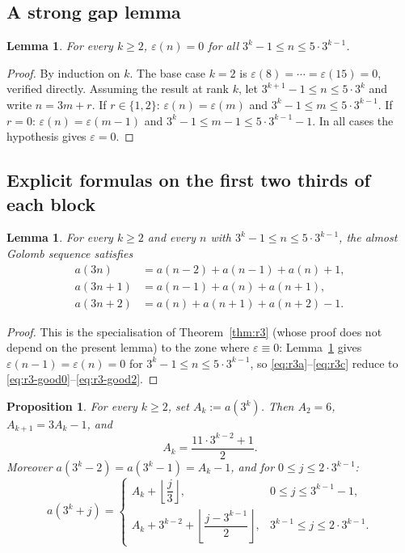 \documentclass[12pt]{article}
\newtheorem{lemma}[theorem]{Lemma}
\newtheorem{proposition}[theorem]{Proposition}
\theoremstyle{definition}
\theoremstyle{remark}
\begin{document}
\subsection{A strong gap lemma}

\begin{lemma}\label{lem:r3-gap}
For every $k\ge 2$, $\varepsilon(n)=0$ for all $3^k-1\le n\le 5\cdot 3^{k-1}$.
\end{lemma}

\begin{proof}
By induction on $k$. The base case $k=2$ is $\varepsilon(8)=\cdots=\varepsilon(15)=0$,
verified directly. Assuming the result at rank $k$, let $3^{k+1}-1\le n\le 5\cdot 3^k$
and write $n=3m+r$.
If $r\in\{1,2\}$: $\varepsilon(n)=\varepsilon(m)$ and $3^k-1\le m\le 5\cdot 3^{k-1}$.
If $r=0$: $\varepsilon(n)=\varepsilon(m-1)$ and $3^k-1\le m-1\le 5\cdot 3^{k-1}-1$.
In all cases the hypothesis gives $\varepsilon=0$.
\end{proof}

\subsection{Explicit formulas on the first two thirds of each block}

\begin{lemma}\label{lem:r3-good-zone}
For every $k\ge 2$ and every $n$ with $3^k-1\le n\le 5\cdot 3^{k-1}$,
the almost Golomb sequence satisfies
\begin{align}
  a(3n)   &= a(n-2)+a(n-1)+a(n)+1, \label{eq:r3-good0}\\
  a(3n+1) &= a(n-1)+a(n)+a(n+1),   \label{eq:r3-good1}\\
  a(3n+2) &= a(n)+a(n+1)+a(n+2)-1. \label{eq:r3-good2}
\end{align}
\end{lemma}

\begin{proof}
This is the specialisation of Theorem~\ref{thm:r3}
(whose proof does not depend on the present lemma) to the zone
where $\varepsilon\equiv 0$: Lemma~\ref{lem:r3-gap} gives
$\varepsilon(n-1)=\varepsilon(n)=0$ for $3^k-1\le n\le 5\cdot 3^{k-1}$,
so \eqref{eq:r3a}--\eqref{eq:r3c} reduce to
\eqref{eq:r3-good0}--\eqref{eq:r3-good2}.
\end{proof}

\begin{proposition}\label{prop:r3-block}
For every $k\ge 2$, set $A_k:=a(3^k)$. Then $A_2=6$, $A_{k+1}=3A_k-1$, and
\[
  A_k=\frac{11\cdot 3^{k-2}+1}{2}.
\]
Moreover $a(3^k-2)=a(3^k-1)=A_k-1$, and for $0\le j\le 2\cdot 3^{k-1}$:
\begin{equation}\label{eq:r3-block}
a(3^k+j)=
\begin{cases}
  A_k+\left\lfloor \dfrac{j}{3}\right\rfloor,
    & 0\le j\le 3^{k-1}-1,\\[2ex]
  A_k+3^{k-2}+\left\lfloor \dfrac{j-3^{k-1}}{2}\right\rfloor,
    & 3^{k-1}\le j\le 2\cdot 3^{k-1}.
\end{cases}
\end{equation}
\end{proposition}
\end{document}
